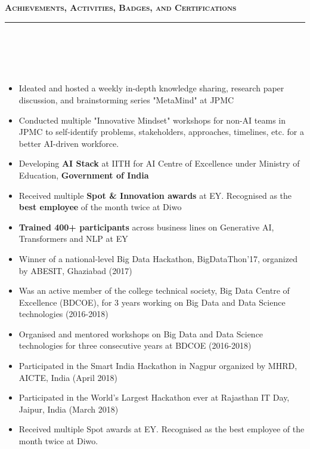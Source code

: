\documentclass[a4paper,10pt]{article}
\newcommand{\isep}{-2 pt}
\newcommand{\lsep}{-0.5cm}
\newcommand{\resheading}[1]{{\small
        {
            \begin{minipage}
                {0.992\textwidth}\textbf{{\textsc{#1 \vphantom{p\^{E}} }}}
                \\[-0.3cm]
                \hrule
            \end{minipage}
            \\[-0.5cm]
        }
 }}
\begin{document}
\vspace{4pt}
\noindent
\resheading{\textbf{\large Achievements, Activities, Badges, and Certifications}}\\[\lsep] 
\\[-0.3cm]
\begin{itemize}\itemsep \isep

\item Ideated and hosted a weekly in-depth knowledge sharing, research paper discussion, and brainstorming series "MetaMind" at JPMC

\item Conducted multiple "Innovative Mindset" workshops for non-AI teams in JPMC to self-identify problems, stakeholders, approaches, timelines, etc. for a better AI-driven workforce. 

\item Developing \textbf{AI Stack} at IITH for AI Centre of Excellence under Ministry of Education, \textbf{Government of India} 

\item Received multiple \textbf{Spot \& Innovation awards} at EY. Recognised as the \textbf{best employee} of the month twice at Diwo 

\item \textbf{Trained 400+ participants} across business lines on Generative AI, Transformers and NLP at EY  
    
\item Winner of a national-level Big Data Hackathon, BigDataThon’17, organized by ABESIT, Ghaziabad (2017)

\item Was an active member of the college technical society, Big Data Centre of Excellence (BDCOE), for 3 years working on Big Data and Data Science technologies (2016-2018)

\item Organised and mentored workshops on Big Data and Data Science technologies for three consecutive years at BDCOE (2016-2018)

\item Participated in the Smart India Hackathon in Nagpur organized by MHRD, AICTE, India (April 2018)

\item Participated in the World's Largest Hackathon ever at Rajasthan IT Day, Jaipur, India (March 2018)

\item Received multiple Spot awards at EY. Recognised as the best employee of the month twice at Diwo.


\end{itemize}
\end{document}
